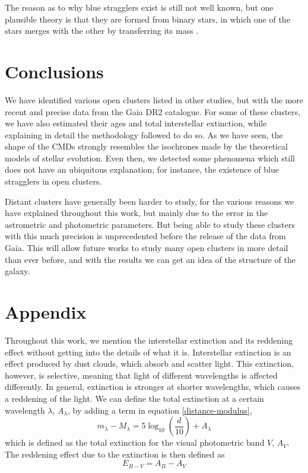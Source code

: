 \documentclass[twocolumn]{revtex4}
\begin{document}
The reason as to why blue stragglers exist is still not well known, but one plausible theory is that they are formed from binary stars, in which one of the stars merges with the other by transferring its mass \cite{stragglers}.


\section{Conclusions}
We have identified various open clusters listed in other studies, but with the more recent and precise data from the Gaia DR2 catalogue. For some of these clusters, we have also estimated their ages and total interstellar extinction, while explaining in detail the methodology followed to do so. As we have seen, the shape of the CMDs strongly resembles the isochrones made by the theoretical models of stellar evolution. Even then, we detected some phenomena which still does not have an ubiquitous explanation, for instance, the existence of blue stragglers in open clusters.

Distant clusters have generally been harder to study, for the various reasons we have explained throughout this work, but mainly due to the error in the astrometric and photometric parameters. But being able to study these clusters with this much precision is unprecedented before the release of the data from Gaia. This will allow future works to study many open clusters in more detail than ever before, and with the results we can get an idea of the structure of the galaxy.

\section{Appendix}
Throughout this work, we mention the interstellar extinction and its reddening effect without getting into the details of what it is. Interstellar extinction is an effect produced by dust clouds, which absorb and scatter light. This extinction, however, is selective, meaning that light of different wavelengths is affected differently. In general, extinction is stronger at shorter wavelengths, which causes a reddening of the light. We can define the total extinction at a certain wavelength $\lambda$, $A_\lambda$, by adding a term in equation \ref{distance-modulus},
\begin{equation}
m_\lambda - M_\lambda = 5 \log_{10} \left( \frac{d}{10} \right) + A_\lambda
\end{equation}
which is defined as the total extinction for the visual photometric band $V$, $A_V$. The reddening effect due to the extinction is then defined as
\begin{equation}
E_{B-V} = A_B - A_V
\end{equation}
\end{document}
